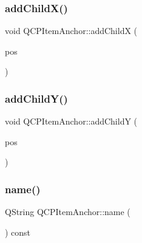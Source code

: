 \subsubsection{\texorpdfstring{addChildX()}{addChildX()}}
{\footnotesize\ttfamily void Q\+C\+P\+Item\+Anchor\+::add\+ChildX (\begin{DoxyParamCaption}\item[{\mbox{\hyperlink{class_q_c_p_item_position}{Q\+C\+P\+Item\+Position}} $\ast$}]{pos }\end{DoxyParamCaption})\hspace{0.3cm}{\ttfamily [protected]}}

\mbox{\label{class_q_c_p_item_anchor_af05dc56f24536f0c7a9a0f57b58cea67}} 
\subsubsection{\texorpdfstring{addChildY()}{addChildY()}}
{\footnotesize\ttfamily void Q\+C\+P\+Item\+Anchor\+::add\+ChildY (\begin{DoxyParamCaption}\item[{\mbox{\hyperlink{class_q_c_p_item_position}{Q\+C\+P\+Item\+Position}} $\ast$}]{pos }\end{DoxyParamCaption})\hspace{0.3cm}{\ttfamily [protected]}}

\mbox{\label{class_q_c_p_item_anchor_aad37cdf5a3f63428f61be739014e212e}} 
\subsubsection{\texorpdfstring{name()}{name()}}
{\footnotesize\ttfamily Q\+String Q\+C\+P\+Item\+Anchor\+::name (\begin{DoxyParamCaption}{ }\end{DoxyParamCaption}) const\hspace{0.3cm}{\ttfamily [inline]}}

\mbox{\label{class_q_c_p_item_anchor_a06dcfb7220d26eee93eef56ae66582cb}} 
